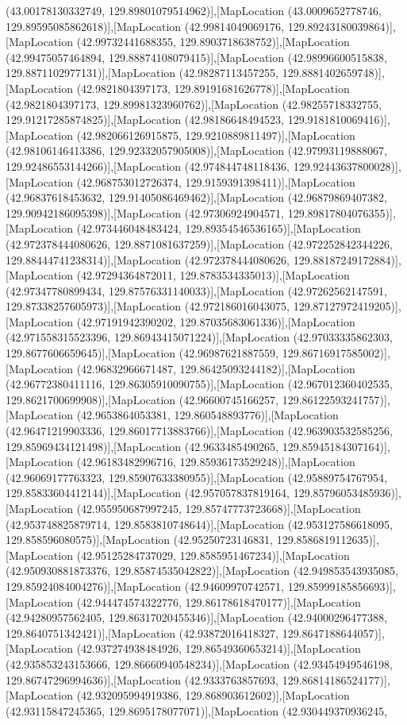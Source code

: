 (43.00178130332749, 129.89801079514962)],[MapLocation (43.0009652778746, 129.89595085862618)],[MapLocation (42.99814049069176, 129.89243180039864)],[MapLocation (42.99732441688355, 129.8903718638752)],[MapLocation (42.99475057464894, 129.88874108079415)],[MapLocation (42.98996600515838, 129.8871102977131)],[MapLocation (42.98287113457255, 129.8881402659748)],[MapLocation (42.9821804397173, 129.89191681626778)],[MapLocation (42.9821804397173, 129.89981323960762)],[MapLocation (42.98255718332755, 129.91217285874825)],[MapLocation (42.98186648494523, 129.9181810069416)],[MapLocation (42.982066126915875, 129.9210889811497)],[MapLocation (42.98106146413386, 129.92332057905008)],[MapLocation (42.97993119888067, 129.92486553144266)],[MapLocation (42.974844748118436, 129.92443637800028)],[MapLocation (42.968753012726374, 129.9159391398411)],[MapLocation (42.96837618453632, 129.91405086469462)],[MapLocation (42.96879869407382, 129.90942186095398)],[MapLocation (42.97306924904571, 129.89817804076355)],[MapLocation (42.973446048483424, 129.89354546536165)],[MapLocation (42.972378444080626, 129.8871081637259)],[MapLocation (42.972252842344226, 129.88444741238314)],[MapLocation (42.972378444080626, 129.88187249172884)],[MapLocation (42.97294364872011, 129.8783534335013)],[MapLocation (42.97347780899434, 129.87576331140033)],[MapLocation (42.97262562147591, 129.87338257605973)],[MapLocation (42.972186016043075, 129.87127972419205)],[MapLocation (42.97191942390202, 129.87035683061336)],[MapLocation (42.971558315523396, 129.86943415071224)],[MapLocation (42.97033335862303, 129.8677606659645)],[MapLocation (42.96987621887559, 129.86716917585002)],[MapLocation (42.96832966671487, 129.86425093244182)],[MapLocation (42.96772380411116, 129.86305910090755)],[MapLocation (42.967012360402535, 129.8621700699908)],[MapLocation (42.96600745166257, 129.86122593241757)],[MapLocation (42.9653864053381, 129.860548893776)],[MapLocation (42.96471219903336, 129.86017713883766)],[MapLocation (42.963903532585256, 129.85969434121498)],[MapLocation (42.9633485490265, 129.85945184307164)],[MapLocation (42.96183482996716, 129.85936173529248)],[MapLocation (42.96069177763323, 129.85907633380955)],[MapLocation (42.95889754767954, 129.85833604412144)],[MapLocation (42.957057837819164, 129.85796053485936)],[MapLocation (42.955950687997245, 129.85747773723668)],[MapLocation (42.953748825879714, 129.8583810748644)],[MapLocation (42.953127586618095, 129.858596080575)],[MapLocation (42.95250723146831, 129.8586819112635)],[MapLocation (42.95125284737029, 129.8585951467234)],[MapLocation (42.950930881873376, 129.85874535042822)],[MapLocation (42.949853543935085, 129.85924084004276)],[MapLocation (42.94609970742571, 129.85999185856693)],[MapLocation (42.944474574322776, 129.86178618470177)],[MapLocation (42.94280957562405, 129.86317020455346)],[MapLocation (42.94000296477388, 129.8640751342421)],[MapLocation (42.93872016418327, 129.8647188644057)],[MapLocation (42.937274938484926, 129.86549360653214)],[MapLocation (42.935853243153666, 129.86660940548234)],[MapLocation (42.93454949546198, 129.86747296994636)],[MapLocation (42.9333763857693, 129.86814186524177)],[MapLocation (42.932095994919386, 129.868903612602)],[MapLocation (42.93115847245365, 129.8695178077071)],[MapLocation (42.930449370936245, 
